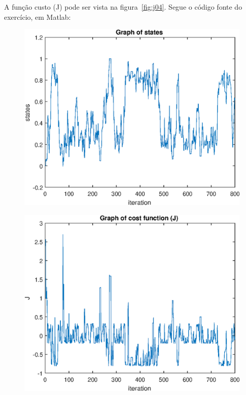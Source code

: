 \documentclass[12pt]{article}
\newenvironment{exercise}[2][Exercício]{\begin{trivlist}
\item[\hskip \labelsep {\bfseries #1}\hskip \labelsep {\bfseries #2.}]}{\end{trivlist}}
\begin{document}
\begin{exercise}{4}

A função custo (J) pode ser vista na figura~\ref{fig:j04}. Segue o código fonte
do exercício, em Matlab:



\begin{figure}[H] 
  \centering
  \includegraphics[width=12cm]{figs/ex4b_states.eps} 
\end{figure}

\begin{figure}[H]
  \centering
  \includegraphics[width=12cm]{figs/ex4b_j.eps} 
\end{figure}


\end{exercise}
\end{document}
